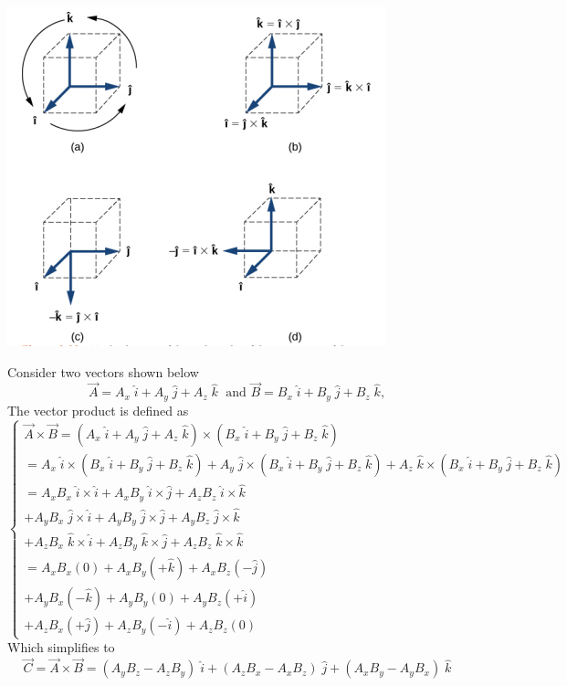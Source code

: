 \documentclass[12pt,addpoints]{exam}
\begin{document}
	 \begin{center}
	 	\includegraphics[scale=0.55]{cyclic.png}
	 \end{center}
 	 Consider two vectors shown below
 	 $$\vec{A} = A_{x}\; \hat{i} + A_{y}\; \hat{j} + A_{z}\; \hat{k}\; \text{ and } \vec{B} = B_{x}\; \hat{i} + B_{y}\; \hat{j} + B_{z}\; \hat{k},$$
 	 The vector product is defined as	
 	$$\begin{cases} \vec{A} \times \vec{B}  = (A_{x}\; \hat{i} + A_{y}\; \hat{j} + A_{z}\; \hat{k}) \times (B_{x}\; \hat{i} + B_{y}\; \hat{j} + B_{z}\; \hat{k}) \\  = A_{x}\; \hat{i} \times (B_{x}\; \hat{i} + B_{y}\; \hat{j} + B_{z}\; \hat{k}) + A_{y}\; \hat{j} \times (B_{x}\; \hat{i} + B_{y}\; \hat{j} + B_{z}\; \hat{k}) + A_{z}\; \hat{k} \times (B_{x}\; \hat{i} + B_{y}\; \hat{j} + B_{z}\; \hat{k}) \\  = A_{x}B_{x}\; \hat{i} \times \hat{i} + A_{x}B_{y}\; \hat{i} \times \hat{j} + A_{z}B_{z}\; \hat{i} \times \hat{k} \\  + A_{y}B_{x}\; \hat{j} \times \hat{i} + A_{y}B_{y}\; \hat{j} \times \hat{j} + A_{y}B_{z}\; \hat{j} \times \hat{k} \\  + A_{z}B_{x}\; \hat{k} \times \hat{i} + A_{z}B_{y}\; \hat{k} \times \hat{j} + A_{z}B_{z}\; \hat{k} \times \hat{k} \\  = A_{x}B_{x}(0) + A_{x}B_{y}(+\hat{k}) + A_{x}B_{z}(-\hat{j}) \\  + A_{y}B_{x}(-\hat{k}) + A_{y}B_{y}(0) + A_{y}B_{z}(+\hat{i}) \\  + A_{z}B_{x}(+\hat{j}) + A_{z}B_{y}(- \hat{i}) + A_{z}B_{z}(0) \end{cases}$$
 	Which simplifies to
 	$$\vec{C} = \vec{A} \times \vec{B} = (A_{y}B_{z} - A_{z}B_{y})\; \hat{i} + (A_{z}B_{x} - A_{x}B_{z})\; \hat{j} + (A_{x}B_{y} - A_{y}B_{x})\; \hat{k} $$
\end{document}
